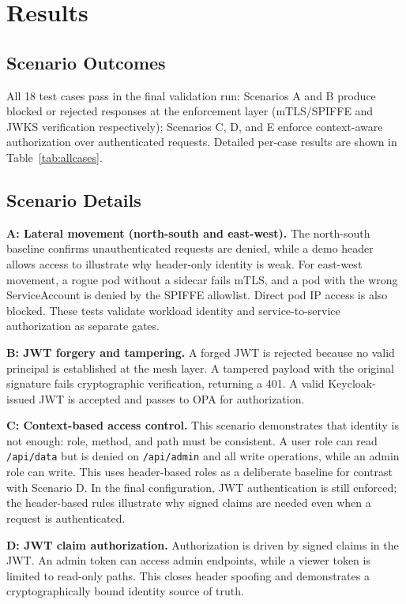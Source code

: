 \documentclass[conference]{IEEEtran}
\begin{document}
\vspace{4pt}
\section{Results}
\subsection{Scenario Outcomes}
All 18 test cases pass in the final validation run: Scenarios A and B produce blocked or
rejected responses at the enforcement layer (mTLS/SPIFFE and JWKS verification respectively);
Scenarios C, D, and E enforce context-aware authorization over authenticated requests.
Detailed per-case results are shown in Table~\ref{tab:allcases}.

\subsection{Scenario Details}
\textbf{A: Lateral movement (north-south and east-west).} The north-south baseline
confirms unauthenticated requests are denied, while a demo header allows access to
illustrate why header-only identity is weak. For east-west movement, a rogue pod
without a sidecar fails mTLS, and a pod with the wrong ServiceAccount is denied by the
SPIFFE allowlist. Direct pod IP access is also blocked. These tests validate workload
identity and service-to-service authorization as separate gates.

\textbf{B: JWT forgery and tampering.} A forged JWT is rejected because no valid
principal is established at the mesh layer. A tampered payload with the original
signature fails cryptographic verification, returning a 401. A valid Keycloak-issued
JWT is accepted and passes to OPA for authorization.

\textbf{C: Context-based access control.} This scenario demonstrates that identity is
not enough: role, method, and path must be consistent. A user role can read
\texttt{/api/data} but is denied on \texttt{/api/admin} and all write operations, while
an admin role can write. This uses header-based roles as a deliberate baseline for
contrast with Scenario D. In the final configuration, JWT authentication is still
enforced; the header-based rules illustrate why signed claims are needed even when a
request is authenticated.

\textbf{D: JWT claim authorization.} Authorization is driven by signed claims in the
JWT. An admin token can access admin endpoints, while a viewer token is limited to
read-only paths. This closes header spoofing and demonstrates a cryptographically
bound identity source of truth.
\end{document}
